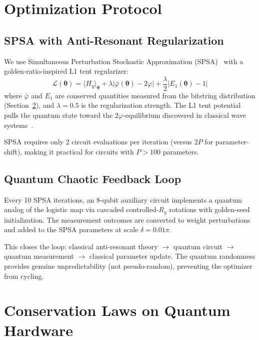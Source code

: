 \documentclass[twocolumn,showpacs,preprintnumbers,amsmath,amssymb,aps,prl]{revtex4-2}
\begin{document}
\section{Optimization Protocol}
\label{sec:optimization}

\subsection{SPSA with Anti-Resonant Regularization}

We use Simultaneous Perturbation Stochastic Approximation (SPSA)~\cite{spall1998implementation} with a golden-ratio-inspired L1 tent regularizer:
\begin{equation}
    \mathcal{L}(\bm{\theta}) = \langle H_q \rangle_{\bm{\theta}} + \lambda|\bar{\varphi}(\bm{\theta}) - 2\varphi| + \frac{\lambda}{2}|E_1(\bm{\theta}) - 1|
\end{equation}
where $\bar{\varphi}$ and $E_1$ are conserved quantities measured from the bitstring distribution (Section~\ref{sec:conserved}), and $\lambda = 0.5$ is the regularization strength. The L1 tent potential pulls the quantum state toward the $2\varphi$-equilibrium discovered in classical wave systems~\cite{knopp2026attractor}.

SPSA requires only 2 circuit evaluations per iteration (versus $2P$ for parameter-shift), making it practical for circuits with $P > 100$ parameters.

\subsection{Quantum Chaotic Feedback Loop}

Every 10 SPSA iterations, an 8-qubit auxiliary circuit implements a quantum analog of the logistic map via cascaded controlled-$R_y$ rotations with golden-seed initialization. The measurement outcomes are converted to weight perturbations and added to the SPSA parameters at scale $\delta = 0.01\pi$.

This closes the loop: classical anti-resonant theory $\to$ quantum circuit $\to$ quantum measurement $\to$ classical parameter update. The quantum randomness provides genuine unpredictability (not pseudo-random), preventing the optimizer from cycling.


\section{Conservation Laws on Quantum Hardware}
\label{sec:conserved}
\end{document}

